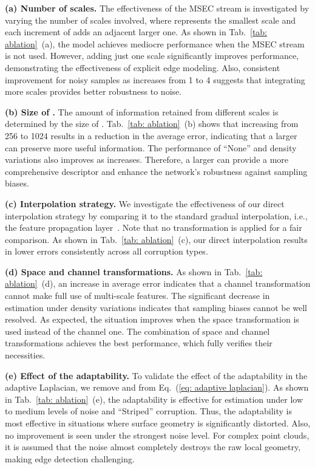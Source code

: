 \documentclass[sigconf]{acmart}
\begin{document}
\indent 

\textbf{(a) Number of scales.}
The effectiveness of the MSEC stream is investigated by varying the number of scales involved, where  represents the smallest scale and each increment of  adds an adjacent larger one. As shown in Tab.~\ref{tab: ablation}~(a), the model achieves mediocre performance when the MSEC stream is not used. However, adding just one scale significantly improves performance, demonstrating the effectiveness of explicit edge modeling.
Also, consistent improvement for noisy samples as  increases from 1 to 4 suggests that integrating more scales provides better robustness to noise.

\textbf{(b) Size of .} 
The amount of information retained from different scales is determined by the size of . Tab.~\ref{tab: ablation}~(b) shows that increasing  from 256 to 1024 results in a reduction in the average error, indicating that a larger  can preserve more useful information. The performance of ``None'' and density variations also improves as  increases. Therefore, a larger  can provide a more comprehensive descriptor and enhance the network's robustness against sampling biases.

\textbf{(c) Interpolation strategy.}
We investigate the effectiveness of our direct interpolation strategy by comparing it to the standard gradual interpolation, i.e., the feature propagation layer~\cite{qi2017pointnet++}. Note that no transformation is applied for a fair comparison. As shown in Tab.~\ref{tab: ablation}~(c), our direct interpolation results in lower errors consistently across all corruption types.

\textbf{(d) Space and channel transformations.} 
As shown in Tab.~\ref{tab: ablation}~(d), an increase in average error indicates that a channel transformation cannot make full use of multi-scale features. The significant decrease in estimation under density variations indicates that sampling biases cannot be well resolved. As expected, the situation improves when the space transformation is used instead of the channel one. The combination of space and channel transformations achieves the best performance, which fully verifies their necessities.  

\textbf{(e) Effect of the adaptability.} 
To validate the effect of the adaptability in the adaptive Laplacian, we remove  and  from Eq.~(\ref{eq: adaptive laplacian}). As shown in Tab.~\ref{tab: ablation}~(e), the adaptability is effective for estimation under low to medium levels of noise and ``Striped'' corruption. Thus, the adaptability is most effective in situations where surface geometry is significantly distorted. Also, no improvement is seen under the strongest noise level. For complex point clouds, it is assumed that the noise almost completely destroys the raw local geometry, making edge detection challenging. 
\end{document}
